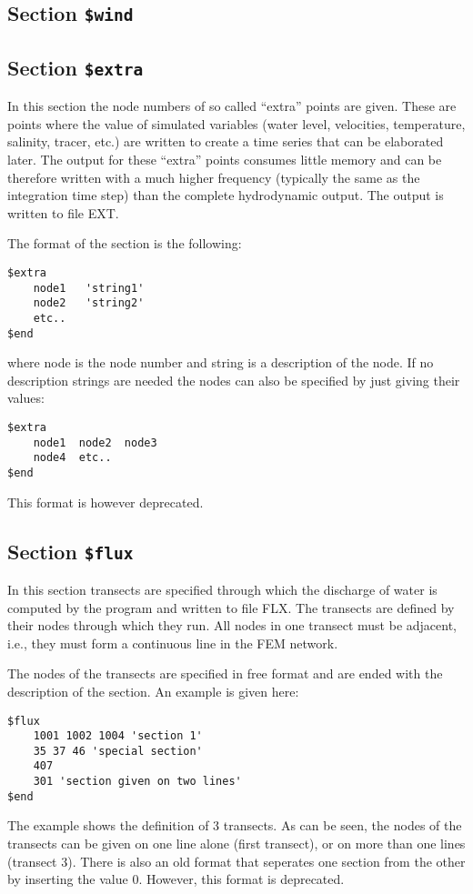 \documentclass{report}
\begin{document}
\subsection{Section {\tt \$wind}}



\subsection{Section {\tt \$extra}}

In this section the node numbers of so called ``extra'' points are given. 
These are points where the value of simulated variables (water level, 
velocities, temperature, salinity, tracer, etc.) are written to create
a time series that can be elaborated later. The output for these ``extra''
points consumes little memory and can be therefore written with a
much higher frequency (typically the same as the integration time step)
than the complete hydrodynamic output. The output is written
to file EXT.

The format of the section is the following:
\begin{verbatim}
$extra
	node1   'string1'
	node2   'string2'
	etc..
$end
\end{verbatim}
where node is the node number and string is a description of the node.
If no description strings are needed the nodes can also be specified
by just giving their values:
\begin{verbatim}
$extra
	node1  node2  node3
	node4  etc..
$end
\end{verbatim}
This format is however deprecated.


\subsection{Section {\tt \$flux}}

In this section transects are specified through which the discharge
of water is computed by the program and written to file FLX.
The transects are defined by their nodes through which they run.
All nodes in one transect must be adjacent, i.e., they must form a
continuous line in the FEM network.

The nodes of the transects are specified in free format and are
ended with the description of the section.
An example is given here:
\begin{verbatim}
$flux
	1001 1002 1004 'section 1'
	35 37 46 'special section'
	407
	301 'section given on two lines'
$end
\end{verbatim}
The example shows the definition of 3 transects. As can be seen, the 
nodes of the transects can be given on one line alone (first transect),
or on more than one lines (transect 3).
There is also an old format that seperates one section from the other by
inserting the value 0. However, this format is deprecated.
\end{document}
